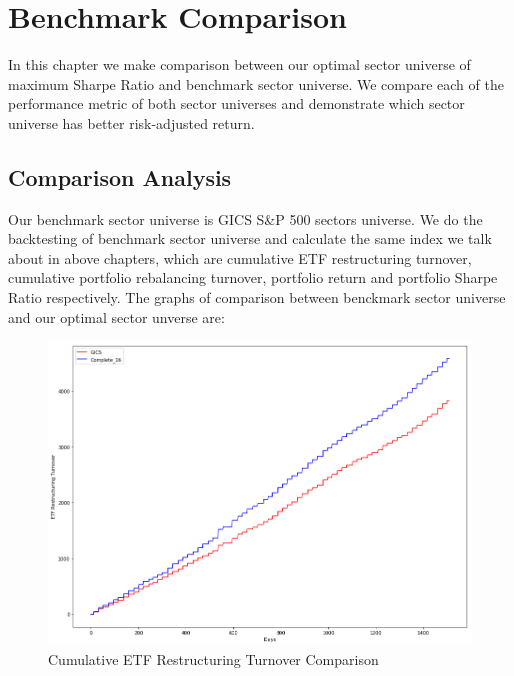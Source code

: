 \documentclass[../main.tex]{subfiles}
\begin{document}
    
\chapter{Benchmark Comparison}

In this chapter we make comparison between our optimal sector universe of maximum Sharpe Ratio and benchmark sector universe. We compare each of the performance metric of both sector universes and demonstrate which sector universe has better risk-adjusted return.  

\section{Comparison Analysis}

Our benchmark sector universe is GICS S\&P 500 sectors universe. We do the backtesting of benchmark sector universe and calculate the same index we talk about in above chapters, which are cumulative ETF restructuring turnover, cumulative portfolio rebalancing turnover, portfolio return and portfolio Sharpe Ratio  respectively. The graphs of comparison between benckmark sector universe and our optimal sector unverse are: 

\begin{figure}[H]
    \centering
    \includegraphics[scale=0.4]{images/etf_restrut_turnover_compare.png}
    \caption{Cumulative ETF Restructuring Turnover Comparison}
    \label{fig:benchmark_comparison:restrut_turnover_comparison}
\end{figure} 
\end{document}
